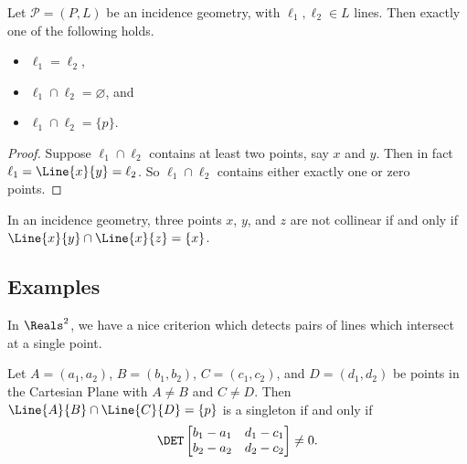 \documentclass{article}
\begin{document}
\begin{prop}
Let $\mathcal{P} = (P,L)$ be an incidence geometry, with $\ell_1, \ell_2 \in L$ lines. Then exactly one of the following holds.
\begin{itemize}
\item $\ell_1 = \ell_2$,
\item $\ell_1 \cap \ell_2 = \varnothing$, and
\item $\ell_1 \cap \ell_2 = \{p\}$.
\end{itemize}
\end{prop}

\begin{proof}
Suppose $\ell_1 \cap \ell_2$ contains at least two points, say $x$ and $y$. Then in fact $\ell_1 = \Line{x}{y} = \ell_2$. So $\ell_1 \cap \ell_2$ contains either exactly one or zero points.
\end{proof}

\begin{cor}
In an incidence geometry, three points $x$, $y$, and $z$ are not collinear if and only if $\Line{x}{y} \cap \Line{x}{z} = \{x\}$.
\end{cor}



\subsection*{Examples}

In $\Reals^2$, we have a nice criterion which detects pairs of lines which intersect at a single point.

\begin{prop}
Let $A = (a_1,a_2)$, $B = (b_1,b_2)$, $C = (c_1,c_2)$, and $D = (d_1,d_2)$ be points in the Cartesian Plane with $A \neq B$ and $C \neq D$. Then $\Line{A}{B} \cap \Line{C}{D} = \{p\}$ is a singleton if and only if \[ \DET \begin{bmatrix} b_1 - a_1 & d_1 - c_1 \\ b_2 - a_2 & d_2 - c_2 \end{bmatrix} \neq 0. \]
\end{prop}
\end{document}
